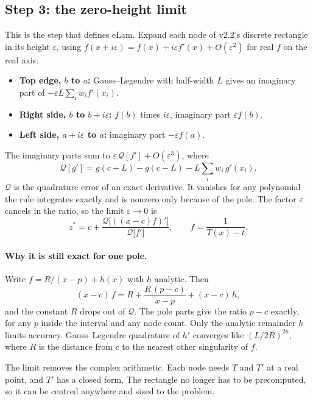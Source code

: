 \documentclass[11pt]{article}
\newcommand{\Q}{\mathcal{Q}}
\begin{document}
\subsection*{Step 3: the zero-height limit}
This is the step that defines eLam. Expand each node of v2.2's discrete rectangle in its height $\varepsilon$, using $f(x+i\varepsilon) = f(x) + i\varepsilon f'(x) + O(\varepsilon^2)$ for real $f$ on the real axis:
\begin{itemize}
  \item \textbf{Top edge, $b$ to $a$:} Gauss--Legendre with half-width $L$ gives an imaginary part of $-\varepsilon L\sum_i w_i f'(x_i)$.
  \item \textbf{Right side, $b$ to $b+i\varepsilon$:} $f(b)$ times $i\varepsilon$, imaginary part $\varepsilon f(b)$.
  \item \textbf{Left side, $a+i\varepsilon$ to $a$:} imaginary part $-\varepsilon f(a)$.
\end{itemize}
The imaginary parts sum to $\varepsilon\,\Q[f'] + O(\varepsilon^3)$, where
\begin{equation}
  \Q[g'] = g(c+L) - g(c-L) - L\sum_i w_i\,g'(x_i).
\end{equation}
$\Q$ is the quadrature error of an exact derivative. It vanishes for any polynomial the rule integrates exactly and is nonzero only because of the pole. The factor $\varepsilon$ cancels in the ratio, so the limit $\varepsilon\to0$ is
\begin{equation}
  \boxed{\;z^* = c + \frac{\Q\big[((x-c)f)'\big]}{\Q\big[f'\big]}, \qquad f = \frac{1}{T(x)-t}.\;}
\end{equation}

\paragraph{Why it is still exact for one pole.} Write $f = R/(x-p) + h(x)$ with $h$ analytic. Then
\[
  (x-c)\,f = R + \frac{R\,(p-c)}{x-p} + (x-c)\,h,
\]
and the constant $R$ drops out of $\Q$. The pole parts give the ratio $p-c$ exactly, for any $p$ inside the interval and any node count. Only the analytic remainder $h$ limits accuracy. Gauss--Legendre quadrature of $h'$ converges like $(L/2R)^{2n}$, where $R$ is the distance from $c$ to the nearest other singularity of $f$.

The limit removes the complex arithmetic. Each node needs $T$ and $T'$ at a real point, and $T'$ has a closed form. The rectangle no longer has to be precomputed, so it can be centred anywhere and sized to the problem.
\end{document}
